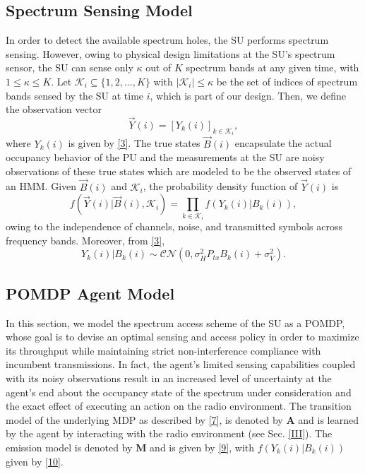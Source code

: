 \documentclass[10pt,twocolumn]{IEEEtran}
\begin{document}
\vspace{-3mm}
\subsection{Spectrum Sensing Model}
In order to detect the available spectrum holes, the SU performs spectrum sensing. However, owing to physical design limitations at the SU's spectrum sensor, the SU can sense only $\kappa$ out of $K$ spectrum bands at any given time, with $1{\leq}\kappa{\leq}K$. Let $\mathcal K_{i}{\subseteq}\{1,2,\dots,K\}$ with $|\mathcal K_i|{\leq}\kappa$ be the set of indices of spectrum bands sensed by the SU at time $i$, which is part of our design.
Then, we define the observation vector
\begin{equation}\label{8}
    \vec{Y}(i) = [Y_k(i)]_{k {\in} \mathcal K_i},
\end{equation}
where $Y_k(i)$ is given by \eqref{3}.
The true states $\vec{B}(i)$ encapsulate the actual occupancy behavior of the PU and the measurements at the SU are noisy observations of these true states which are modeled to be the observed states of an HMM. Given $\vec{B}(i)$ and $\mathcal K_i$, the probability density function of $\vec{Y}(i)$ is
\begin{equation}\label{9}
    f(\vec{Y}(i)|\vec{B}(i), \mathcal K_i) = \prod_{k \in \mathcal K_i} f(Y_k(i)|B_k(i)),
\end{equation}
owing to the independence of channels, noise, and transmitted symbols across frequency bands. Moreover, from \eqref{3},
\begin{equation}\label{10}
 Y_k(i)|B_k(i) \sim \mathcal{CN}(0, \sigma_H^2P_{tx}B_k(i) + \sigma_V^2).
\end{equation}
\subsection{POMDP Agent Model}
In this section, we model the spectrum access scheme of the SU as a POMDP, whose goal is to devise an optimal sensing and access policy in order to maximize its throughput while maintaining strict non-interference compliance with incumbent transmissions. In fact, the agent's limited sensing capabilities coupled with its noisy observations result in an increased level of uncertainty at the agent's end about the occupancy state of the spectrum under consideration and the exact effect of executing an action on the radio environment. The transition model of the underlying MDP as described by \eqref{7}, is denoted by $\mathbf{A}$ and is learned by the agent by interacting with the radio environment (see Sec. \ref{III}). The emission model is denoted by $\mathbf{M}$ and is given by \eqref{9}, with $f(Y_k(i)|B_k(i))$ given by \eqref{10}. 
\end{document}
